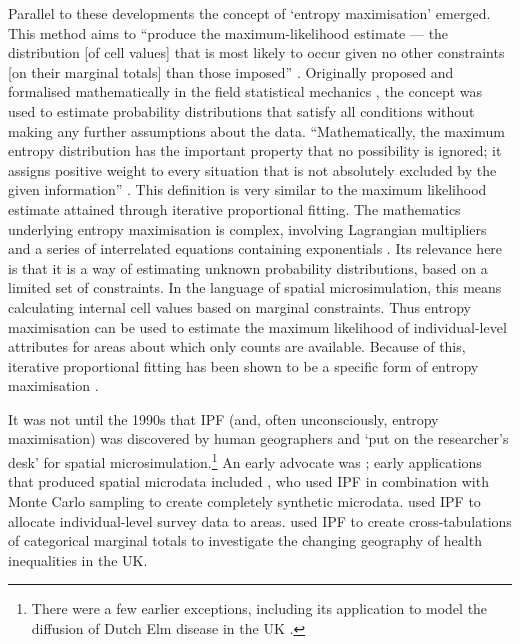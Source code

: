 Parallel to these developments the concept of `entropy maximisation' emerged.
This method aims to ``produce the maximum-likelihood estimate --- the distribution [of cell
values] that is most likely to occur given no other constraints [on their
marginal totals] than those imposed'' \citep[p.~95]{johnston1985geography}.
Originally proposed and formalised mathematically in the field statistical
mechanics \citep{jaynes1957information}, the concept was used to estimate
probability distributions that satisfy all conditions without making any
further assumptions about the data. ``Mathematically, the maximum entropy
distribution has the important property that no possibility is ignored; it
assigns positive weight to every situation that is not absolutely excluded by
the given information'' \citep[p.~623]{jaynes1957information}.
This definition is very similar to the maximum likelihood estimate attained
through iterative proportional fitting. The mathematics underlying entropy maximisation
is complex,
involving Lagrangian multipliers and
a series of interrelated equations containing exponentials
\citep{jaynes1957information}. Its relevance here is that it is a way of
estimating unknown probability distributions, based on a limited set of
constraints. In the language of spatial microsimulation, this means calculating
internal cell values based on marginal constraints. Thus entropy maximisation
can be used to estimate the maximum likelihood of individual-level attributes
for areas about which only counts are available. Because of this, iterative
proportional fitting has been shown to be a specific form of
entropy maximisation \citep{Beckman1996, ye2009methodology, Rich2012}.

It was not until the
1990s
that IPF (and, often unconsciously, entropy maximisation) was discovered by
human geographers and
`put on the researcher's desk' \citep{Norman1999a} for spatial
microsimulation.\footnote{There
were a few earlier exceptions, including its application to
model the diffusion of Dutch Elm disease in the UK \citep{sarre1978diffusion}.
}
An early advocate was \citet{Wong1992}; early applications that produced
spatial microdata included \citet{Birkin1988}, who used IPF in combination with
Monte Carlo sampling to create completely synthetic microdata.
\citet{Ballas1999} used IPF to allocate individual-level survey data to
areas.\citet{Mitchell2002} used IPF to create cross-tabulations
of categorical marginal totals to investigate the changing geography of health
inequalities in the UK.

